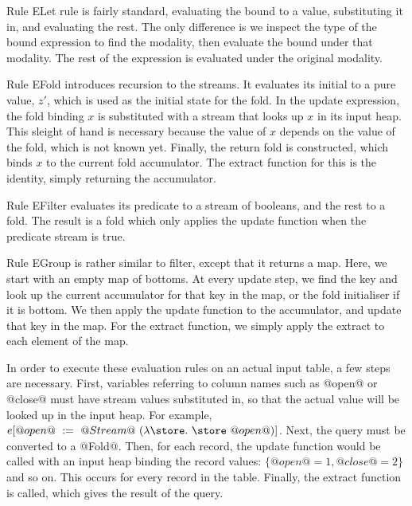 Rule ELet rule is fairly standard, evaluating the bound to a value, substituting it in, and evaluating the rest.
The only difference is we inspect the type of the bound expression to find the modality, then evaluate the bound under that modality.
The rest of the expression is evaluated under the original modality.

Rule EFold introduces recursion to the streams.
It evaluates its initial to a pure value, $z'$, which is used as the initial state for the fold.
In the update expression, the fold binding $x$ is substituted with a stream that looks up $x$ in its input heap.
This sleight of hand is necessary because the value of $x$ depends on the value of the fold, which is not known yet.
Finally, the return fold is constructed, which binds $x$ to the current fold accumulator.
The extract function for this is the identity, simply returning the accumulator.

Rule EFilter evaluates its predicate to a stream of booleans, and the rest to a fold.
The result is a fold which only applies the update function when the predicate stream is true.

Rule EGroup is rather similar to filter, except that it returns a map.
Here, we start with an empty map of bottoms.
At every update step, we find the key and look up the current accumulator for that key in the map, or the fold initialiser if it is bottom.
We then apply the update function to the accumulator, and update that key in the map.
For the extract function, we simply apply the extract to each element of the map.

In order to execute these evaluation rules on an actual input table, a few steps are necessary.
First, variables referring to column names such as @open@ or @close@ must have stream values substituted in, so that the actual value will be looked up in the input heap.
For example, $e[@open@~:=~@Stream@~(\lam{\store} \store~@open@)]$.
Next, the query must be converted to a @Fold@.
Then, for each record, the update function would be called with an input heap binding the record values: $\{@open@ = 1, @close@ = 2\}$ and so on.
This occurs for every record in the table.
Finally, the extract function is called, which gives the result of the query.

